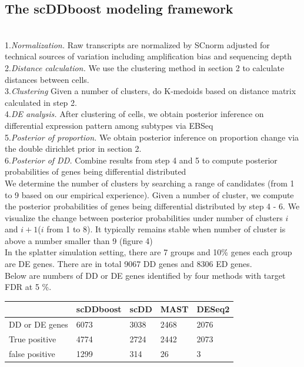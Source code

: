 \documentclass[11pt]{amsart}
\begin{document}
\subsection{The scDDboost modeling framework}\hfill\\
1.\textit{Normalization.} Raw transcripts are normalized by SCnorm\cite{ref:Rhonda} adjusted for technical sources of variation including amplification bias and sequencing depth\\
2.\textit{Distance calculation.} We use the clustering method in section 2 to calculate distances between cells.\\
3.\textit{Clustering} Given a number of clusters, do K-medoids based on distance matrix calculated in step 2.\\   
4.\textit{DE analysis.} After clustering of cells, we obtain posterior inference on differential expression pattern among subtypes via EBSeq\cite{ref:Leng}\\
5.\textit{Posterior of proportion.} We obtain posterior inference on proportion change via the double dirichlet prior in section 2. \\
6.\textit{Posterior of DD.} Combine results from step 4 and 5 to compute posterior probabilities of genes being differential distributed\\
We determine the number of clusters by searching a range of candidates (from 1 to 9 based on our empirical experience). Given a number of cluster, we compute the posterior probabilities of genes being differential distributed by step 4 - 6. We visualize the change between posterior probabilities under number of clusters $i$ and $i + 1$($i$ from 1 to 8). It typically remains stable when number of cluster is above a number smaller than 9 (figure 4)\\
In the splatter simulation setting, there are 7 groups and 10\% genes each group are DE genes. There are in total 9067 DD genes and 8306 ED genes.\\
Below are numbers of DD or DE genes identified by four methods with target FDR at 5 \%. \\
\begin{tabular}{ |p{3cm}|p{3cm}|p{3cm}|p{3cm}|p{3cm}|}
\hline
 & scDDboost & scDD & MAST & DESeq2\\
\hline
\hline
DD or DE genes & 6073 & 3038 & 2468 & 2076\\
\hline
True positive & 4774 & 2724 & 2442 & 2073\\
\hline
false positive & 1299 & 314 & 26 & 3\\
\hline
\end{tabular}\\
\end{document}
